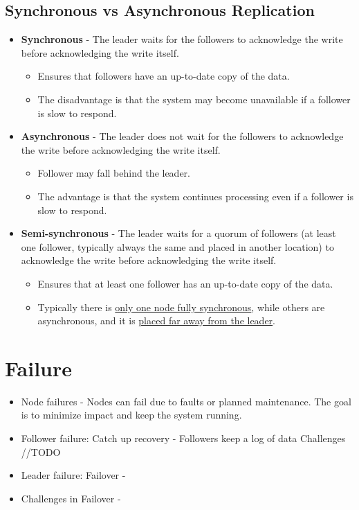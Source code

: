 \subsection{Synchronous vs Asynchronous Replication}
\begin{itemize}
   \item \textbf{Synchronous} - The leader waits for the followers to acknowledge the write before acknowledging the write itself.
   \begin{itemize}
      \item Ensures that followers have an up-to-date copy of the data.
      \item The disadvantage is that the system may become unavailable if a follower is slow to respond.
   \end{itemize}
   \item \textbf{Asynchronous} - The leader does not wait for the followers to acknowledge the write before acknowledging the write itself.
   \begin{itemize}
      \item Follower may fall behind the leader.
      \item The advantage is that the system continues processing even if a follower is slow to respond.
   \end{itemize}
   \item \textbf{Semi-synchronous} - The leader waits for a quorum of followers (at least one follower, typically always the same and placed in another location) to acknowledge the write before acknowledging the write itself.
   \begin{itemize}
      \item Ensures that at least one follower has an up-to-date copy of the data.
      \item Typically there is \ul{only one node fully synchronous}, while others are asynchronous, and it is \ul{placed far away from the leader}.
   \end{itemize}
\end{itemize}

\section{Failure}
\begin{itemize}
   \item Node failures - Nodes can fail due to faults or planned maintenance. The goal is to minimize impact and keep the system running.
   \item Follower failure: Catch up recovery - Followers keep a log of data Challenges //TODO
   \item Leader failure: Failover - 
   \item Challenges in Failover -
\end{itemize}

